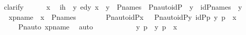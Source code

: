 \begin{isabellebody}
\ \ \isamarkupfalse%
\ {\isacharparenleft}{\kern0pt}clarify{\isacharparenright}{\kern0pt}\isanewline
\ \ \ \ \isamarkupfalse%
\ x\ \isamarkupfalse%
\ ih\ {\isacharcolon}{\kern0pt}\ {\isachardoublequoteopen}{\isacharparenleft}{\kern0pt}{\isasymAnd}y{\isachardot}{\kern0pt}\ ed{\isacharparenleft}{\kern0pt}y{\isacharcomma}{\kern0pt}\ x{\isacharparenright}{\kern0pt}\ {\isasymLongrightarrow}\ y\ {\isasymin}\ P{\isacharunderscore}{\kern0pt}names\ {\isasymlongrightarrow}\ Pn{\isacharunderscore}{\kern0pt}auto{\isacharparenleft}{\kern0pt}id{\isacharparenleft}{\kern0pt}P{\isacharparenright}{\kern0pt}{\isacharparenright}{\kern0pt}\ {\isacharbackquote}{\kern0pt}\ y\ {\isacharequal}{\kern0pt}\ id{\isacharparenleft}{\kern0pt}P{\isacharunderscore}{\kern0pt}names{\isacharparenright}{\kern0pt}\ {\isacharbackquote}{\kern0pt}\ y{\isacharparenright}{\kern0pt}{\isachardoublequoteclose}\isanewline
\ \ \ \ \ xpname\ {\isacharcolon}{\kern0pt}\ {\isachardoublequoteopen}x\ {\isasymin}\ P{\isacharunderscore}{\kern0pt}names{\isachardoublequoteclose}\ \isanewline
\isanewline
\ \ \ \ \isamarkupfalse%
\ {\isachardoublequoteopen}\ Pn{\isacharunderscore}{\kern0pt}auto{\isacharparenleft}{\kern0pt}id{\isacharparenleft}{\kern0pt}P{\isacharparenright}{\kern0pt}{\isacharparenright}{\kern0pt}{\isacharbackquote}{\kern0pt}x\ {\isacharequal}{\kern0pt}\ {\isacharbraceleft}{\kern0pt}\ {\isacharless}{\kern0pt}Pn{\isacharunderscore}{\kern0pt}auto{\isacharparenleft}{\kern0pt}id{\isacharparenleft}{\kern0pt}P{\isacharparenright}{\kern0pt}{\isacharparenright}{\kern0pt}{\isacharbackquote}{\kern0pt}y{\isacharcomma}{\kern0pt}\ id{\isacharparenleft}{\kern0pt}P{\isacharparenright}{\kern0pt}{\isacharbackquote}{\kern0pt}p{\isachargreater}{\kern0pt}{\isachardot}{\kern0pt}\ {\isacharless}{\kern0pt}y{\isacharcomma}{\kern0pt}\ p{\isachargreater}{\kern0pt}\ {\isasymin}\ x\ {\isacharbraceright}{\kern0pt}{\isachardoublequoteclose}\ \isanewline
\ \ \ \ \ \ \isamarkupfalse%
\ Pn{\isacharunderscore}{\kern0pt}auto\ xpname\ \isamarkupfalse%
\ auto\ \isanewline
\ \ \ \ \isamarkupfalse%
\ \isamarkupfalse%
\ {\isachardoublequoteopen}{\isachardot}{\kern0pt}{\isachardot}{\kern0pt}{\isachardot}{\kern0pt}\ {\isacharequal}{\kern0pt}\ {\isacharbraceleft}{\kern0pt}\ {\isacharless}{\kern0pt}y{\isacharcomma}{\kern0pt}\ p{\isachargreater}{\kern0pt}\ {\isachardot}{\kern0pt}\ {\isacharless}{\kern0pt}y{\isacharcomma}{\kern0pt}\ p{\isachargreater}{\kern0pt}\ {\isasymin}\ x\ {\isacharbraceright}{\kern0pt}{\isachardoublequoteclose}\ \isanewline

\end{isabellebody}
